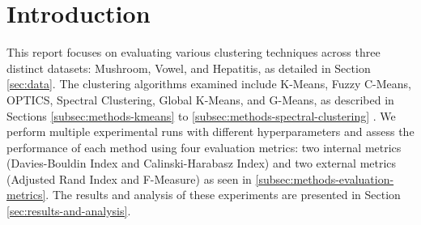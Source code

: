 \section{Introduction}
\label{sec:introduction}


This report focuses on evaluating various clustering techniques across three distinct datasets: Mushroom, Vowel, and Hepatitis, as detailed in Section \ref{sec:data}. The clustering algorithms examined include K-Means, Fuzzy C-Means, OPTICS, Spectral Clustering, Global K-Means, and G-Means, as described in Sections \ref{subsec:methods-kmeans} to \ref{subsec:methods-spectral-clustering} . We perform multiple experimental runs with different hyperparameters and assess the performance of each method using four evaluation metrics: two internal metrics (Davies-Bouldin Index and Calinski-Harabasz Index) and two external metrics (Adjusted Rand Index and F-Measure) as seen in \ref{subsec:methods-evaluation-metrics}. The results and analysis of these experiments are presented in Section \ref{sec:results-and-analysis}.
